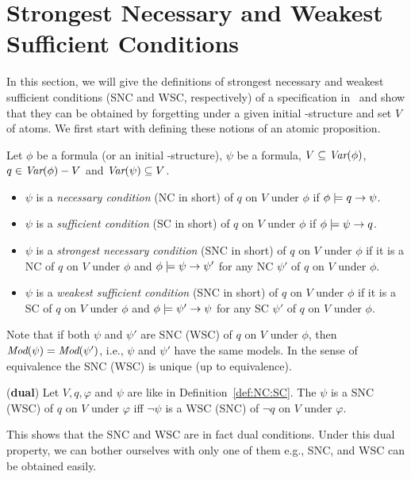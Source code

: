 \documentclass[letterpaper]{article} %
\begin{document}
\section{Strongest Necessary and Weakest Sufficient Conditions}
In this section, we will give the definitions of strongest necessary and weakest sufficient conditions (SNC and WSC, respectively) of a specification in \CTL\ and show that they can be obtained by forgetting under a given initial \MPK-structure and set $V$ of atoms.
We first start with defining these notions of an atomic proposition.
\begin{definition}\label{def:NC:SC}
Let $\phi$ be a formula (or an initial \MPK-structure), $\psi$ be a formula, $V \subseteq \textit{Var}(\phi)$, $q\in\textit{Var}(\phi)- V$
and $\textit{Var}(\psi)\subseteq V$.
\begin{itemize}
  \item $\psi$  is a {\em necessary condition} (NC in short) of $q$ on $V$ under $\phi$
    if $\phi \models q \rightarrow \psi$.
  \item $\psi$  is a {\em sufficient condition} (SC in short) of $q$ on $V$ under $\phi$
    if $\phi \models \psi\rightarrow q$.
  \item $\psi$  is a {\em strongest necessary condition} (SNC in short)
  of $q$ on $V$ under $\phi$
    if it is a NC of $q$ on $V$ under $\phi$ and $\phi\models\psi\rightarrow\psi'$
    for any NC $\psi'$ of $q$ on $V$ under $\phi$.

    \item $\psi$  is a {\em weakest sufficient condition} (SNC in short)
  of $q$ on $V$ under $\phi$
    if it is a SC of $q$ on $V$ under $\phi$ and $\phi\models\psi'\rightarrow\psi$
    for any SC $\psi'$ of $q$ on $V$ under $\phi$.
\end{itemize}
\end{definition}
Note that if both $\psi$ and $\psi'$ are SNC (WSC) of $q$ on $V$ under $\phi$, then
$\textit{Mod}(\psi)=\textit{Mod}(\psi')$, i.e., $\psi$ and $\psi'$ have the same models. In the sense
of equivalence the SNC (WSC) is unique (up to equivalence).



\begin{proposition}\label{dual}
(\textbf{dual})
 Let $V,q,\varphi$ and $\psi$ are like in Definition~\ref{def:NC:SC}.
 The $\psi$ is a SNC (WSC) of $q$ on $V$ under $\varphi$ iff $\neg \psi$ is a WSC (SNC)
    of $\neg q$ on $V$ under $\varphi$.
\end{proposition}
This shows that the SNC and WSC are in fact dual conditions. Under this dual property, we can bother ourselves with only one of them e.g., SNC,  and WSC can be obtained easily. %
%
\end{document}
